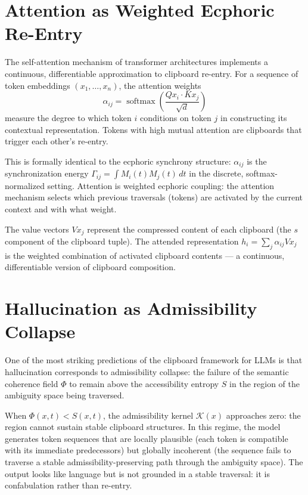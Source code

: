 \documentclass[12pt,oneside]{book}
\theoremstyle{plain}
\theoremstyle{definition}
\theoremstyle{plain}
\DeclareMathOperator{\softmax}{softmax}
\begin{document}
\section{Attention as Weighted Ecphoric Re-Entry}

The self-attention mechanism of transformer architectures implements a continuous, differentiable approximation to clipboard re-entry. For a sequence of token embeddings $(x_1, \ldots, x_n)$, the attention weights
\[
\alpha_{ij} = \softmax\!\left(\frac{Q x_i \cdot K x_j}{\sqrt{d}}\right)
\]
measure the degree to which token $i$ conditions on token $j$ in constructing its contextual representation. Tokens with high mutual attention are clipboards that trigger each other's re-entry.

This is formally identical to the ecphoric synchrony structure: $\alpha_{ij}$ is the synchronization energy $\Gamma_{ij} = \int M_i(t) M_j(t) \, dt$ in the discrete, softmax-normalized setting. Attention is weighted ecphoric coupling: the attention mechanism selects which previous traversals (tokens) are activated by the current context and with what weight.

The value vectors $V x_j$ represent the compressed content of each clipboard (the $s$ component of the clipboard tuple). The attended representation $h_i = \sum_j \alpha_{ij} V x_j$ is the weighted combination of activated clipboard contents — a continuous, differentiable version of clipboard composition.

\section{Hallucination as Admissibility Collapse}

One of the most striking predictions of the clipboard framework for LLMs is that hallucination corresponds to admissibility collapse: the failure of the semantic coherence field $\Phi$ to remain above the accessibility entropy $S$ in the region of the ambiguity space being traversed.

When $\Phi(x,t) < S(x,t)$, the admissibility kernel $\mathcal{K}(x)$ approaches zero: the region cannot sustain stable clipboard structures. In this regime, the model generates token sequences that are locally plausible (each token is compatible with its immediate predecessors) but globally incoherent (the sequence fails to traverse a stable admissibility-preserving path through the ambiguity space). The output looks like language but is not grounded in a stable traversal: it is confabulation rather than re-entry.
\end{document}
